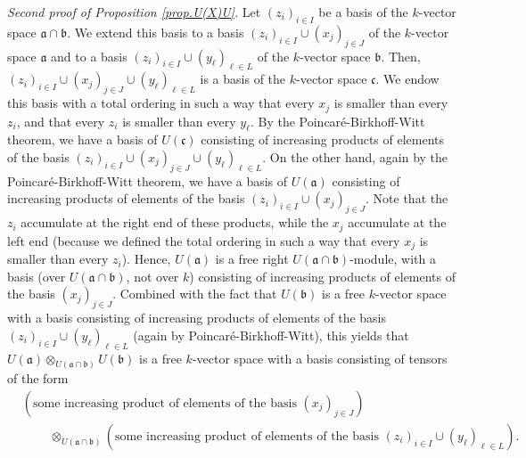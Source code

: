 \documentclass[etingof-lie.tex]{subfiles}
\begin{document}
\textit{Second proof of Proposition \ref{prop.U(X)U}.} Let $\left(
z_{i}\right)  _{i\in I}$ be a basis of the $k$-vector space $\mathfrak{a}%
\cap\mathfrak{b}$. We extend this basis to a basis $\left(  z_{i}\right)
_{i\in I}\cup\left(  x_{j}\right)  _{j\in J}$ of the $k$-vector space
$\mathfrak{a}$ and to a basis $\left(  z_{i}\right)  _{i\in I}\cup\left(
y_{\ell}\right)  _{\ell\in L}$ of the $k$-vector space $\mathfrak{b}$. Then,
$\left(  z_{i}\right)  _{i\in I}\cup\left(  x_{j}\right)  _{j\in J}\cup\left(
y_{\ell}\right)  _{\ell\in L}$ is a basis of the $k$-vector space
$\mathfrak{c}$. We endow this basis with a total ordering in such a way that
every $x_{j}$ is smaller than every $z_{i}$, and that every $z_{i}$ is smaller
than every $y_{\ell}$. By the Poincar\'{e}-Birkhoff-Witt theorem, we have a
basis of $U\left(  \mathfrak{c}\right)  $ consisting of increasing products of
elements of the basis $\left(  z_{i}\right)  _{i\in I}\cup\left(
x_{j}\right)  _{j\in J}\cup\left(  y_{\ell}\right)  _{\ell\in L}$. On the
other hand, again by the Poincar\'{e}-Birkhoff-Witt theorem, we have a basis
of $U\left(  \mathfrak{a}\right)  $ consisting of increasing products of
elements of the basis $\left(  z_{i}\right)  _{i\in I}\cup\left(
x_{j}\right)  _{j\in J}$. Note that the $z_{i}$ accumulate at the right end of
these products, while the $x_{j}$ accumulate at the left end (because we
defined the total ordering in such a way that every $x_{j}$ is smaller than
every $z_{i}$). Hence, $U\left(  \mathfrak{a}\right)  $ is a free right
$U\left(  \mathfrak{a}\cap\mathfrak{b}\right)  $-module, with a basis (over
$U\left(  \mathfrak{a}\cap\mathfrak{b}\right)  $, not over $k$) consisting of
increasing products of elements of the basis $\left(  x_{j}\right)  _{j\in J}%
$. Combined with the fact that $U\left(  \mathfrak{b}\right)  $ is a free
$k$-vector space with a basis consisting of increasing products of elements of
the basis $\left(  z_{i}\right)  _{i\in I}\cup\left(  y_{\ell}\right)
_{\ell\in L}$ (again by Poincar\'{e}-Birkhoff-Witt), this yields that
$U\left(  \mathfrak{a}\right)  \otimes_{U\left(  \mathfrak{a}\cap
\mathfrak{b}\right)  }U\left(  \mathfrak{b}\right)  $ is a free $k$-vector
space with a basis consisting of tensors of the form%
\begin{align*}
&  \left(  \text{some increasing product of elements of the basis }\left(
x_{j}\right)  _{j\in J}\right) \\
&  \ \ \ \ \ \ \ \ \ \ \otimes_{U\left(  \mathfrak{a}\cap\mathfrak{b}\right)
}\left(  \text{some increasing product of elements of the basis }\left(
z_{i}\right)  _{i\in I}\cup\left(  y_{\ell}\right)  _{\ell\in L}\right)  .
\end{align*}
\end{document}
